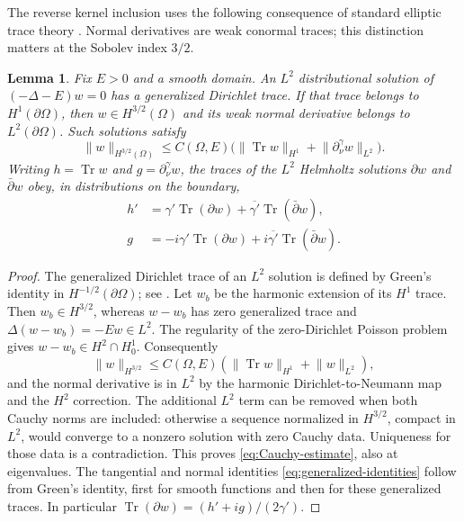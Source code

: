 \documentclass[11pt]{amsart}
\numberwithin{equation}{section}
\newtheorem{lemma}{Lemma}[section]
\newcommand{\norm}[1]{\lVert #1\rVert}
\begin{document}
The reverse kernel inclusion uses the following consequence of
standard elliptic trace theory \cite{LM,McLean}. Normal derivatives are
weak conormal traces; this distinction matters at the Sobolev index
$3/2$.

\begin{lemma}\label{lem:generalized-traces}
Fix $E>0$ and a smooth domain. An $L^2$ distributional solution of
$(-\Delta-E)w=0$ has a generalized Dirichlet trace. If that trace belongs
to $H^1(\partial\Omega)$, then $w\in H^{3/2}(\Omega)$ and its weak
normal derivative belongs to $L^2(\partial\Omega)$. Such solutions satisfy
\begin{equation}\label{eq:Cauchy-estimate}
 \norm w_{H^{3/2}(\Omega)}\le C(\Omega,E)
 \bigl(\norm{\operatorname{Tr}w}_{H^1}
       +\norm{\partial_\nu^\gamma w}_{L^2}\bigr).
\end{equation}
Writing $h=\operatorname{Tr}w$ and $g=\partial_\nu^\gamma w$, the
traces of the $L^2$ Helmholtz solutions $\partial w$ and $\bar\partial w$
obey, in distributions on the boundary,
\begin{equation}\label{eq:generalized-identities}
 \begin{split}
 h'&=\gamma'\operatorname{Tr}(\partial w)
          +\overline{\gamma'}\operatorname{Tr}(\bar\partial w),\\
 g&=-i\gamma'\operatorname{Tr}(\partial w)
          +i\overline{\gamma'}\operatorname{Tr}(\bar\partial w).
 \end{split}
\end{equation}
\end{lemma}
\begin{proof}
The generalized Dirichlet trace of an $L^2$ solution is defined by
Green's identity in $H^{-1/2}(\partial\Omega)$; see \cite{LM,McLean}.
Let $w_b$ be the harmonic extension of its $H^1$ trace. Then
$w_b\in H^{3/2}$, whereas $w-w_b$ has zero generalized trace and
$\Delta(w-w_b)=-Ew\in L^2$. The regularity of the zero-Dirichlet
Poisson problem gives $w-w_b\in H^2\cap H_0^1$. Consequently
\[
 \norm w_{H^{3/2}}\le C(\Omega,E)
       (\norm{\operatorname{Tr}w}_{H^1}+\norm w_{L^2}),
\]
and the normal derivative is in $L^2$ by the harmonic
Dirichlet-to-Neumann map and the $H^2$ correction. The additional
$L^2$ term can be removed when both Cauchy norms are included:
otherwise a sequence normalized in $H^{3/2}$, compact in $L^2$,
would converge to a nonzero solution with zero Cauchy data.
Uniqueness for those data is a contradiction. This proves
\eqref{eq:Cauchy-estimate}, also at eigenvalues.
The tangential and normal identities \eqref{eq:generalized-identities}
follow from Green's identity, first for smooth functions and then for
these generalized traces. In particular
$\operatorname{Tr}(\partial w)=(h'+ig)/(2\gamma')$.
\end{proof}
\end{document}
